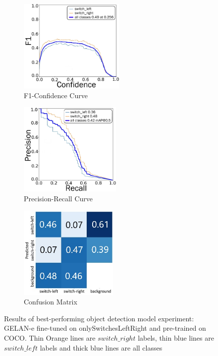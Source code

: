 \begin{figure}[H]
    \centering
    \begin{subfigure}{0.32\textwidth}
        \centering
        \includegraphics[width=\linewidth,height=4.5cm,keepaspectratio]{PICs/experiments/objectdetectionExperiment/F1_curve_updated_v2.jpg}
        \caption{F1-Confidence Curve}
        \label{fig:objectDetectionResultsMetrics_a}
    \end{subfigure}
    \begin{subfigure}{0.32\textwidth}
        \centering
        \includegraphics[width=\linewidth,height=4.5cm,keepaspectratio]{PICs/experiments/objectdetectionExperiment/PR_curve_updated_v2.jpg}
        \caption{Precision-Recall Curve}
        \label{fig:objectDetectionResultsMetrics_b}
    \end{subfigure}
    \begin{subfigure}{0.32\textwidth}
        \centering
        \includegraphics[width=\linewidth,height=4.5cm,keepaspectratio]{PICs/experiments/objectdetectionExperiment/confusion_matrix_updated_v2.jpg}
        \caption{Confusion Matrix}
        \label{fig:objectDetectionResultsMetrics_c}
    \end{subfigure}
    \caption{Results of best-performing object detection model experiment: \ac{GELAN}-e fine-tuned on onlySwitchesLeftRight and pre-trained on COCO.
    Thin Orange lines are $switch\_right$ labels, thin blue lines are $switch\_left$ labels and thick blue lines are all classes}
    \label{fig:objectDetectionResultsMetrics}
\end{figure}

